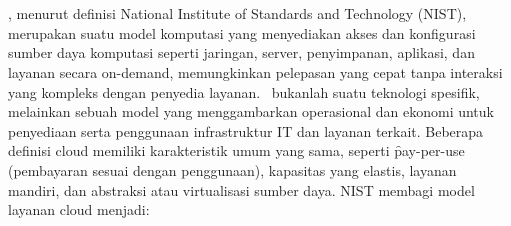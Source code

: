 \chapter{\babDua}

\section{\cc}
\hspace{0.5cm} \cc, menurut definisi National Institute of Standards and Technology (NIST), merupakan suatu model komputasi yang menyediakan akses dan konfigurasi sumber daya komputasi seperti jaringan, server, penyimpanan, aplikasi, dan layanan secara on-demand, memungkinkan pelepasan yang cepat tanpa interaksi yang kompleks dengan penyedia layanan\cite{mell2009nist}. \cc\ bukanlah suatu teknologi spesifik, melainkan sebuah model yang menggambarkan operasional dan ekonomi untuk penyediaan serta penggunaan infrastruktur IT dan layanan terkait. Beberapa definisi cloud memiliki karakteristik umum yang sama, seperti \f{pay-per-use} (pembayaran sesuai dengan penggunaan), kapasitas yang elastis, layanan mandiri, dan abstraksi atau virtualisasi sumber daya\cite{Buyya_Broberg_Goscinski_2011}. NIST membagi model layanan cloud menjadi\cite{mell2009nist}:
